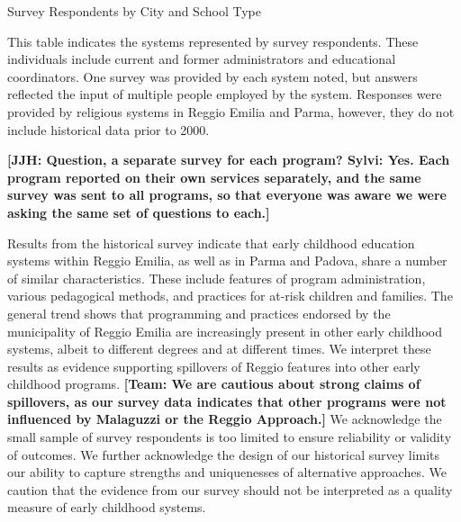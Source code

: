 \begin{table}[H]
\centering
\caption{Survey Respondents by City and School Type}\label{tab:respondents}
\begin{threeparttable}
	
\begin{tablenotes}
This table indicates the systems represented by survey respondents. These individuals include current and former administrators and educational coordinators. One survey was provided by each system noted, but answers reflected the input of multiple people employed by the system. Responses were provided by religious systems in Reggio Emilia and Parma, however, they do not include historical data prior to 2000.
\end{tablenotes}
\end{threeparttable}
\end{table}

\textbf{[JJH: Question, a separate survey for each program? Sylvi: Yes. Each program reported on their own services separately, and the same survey was sent to all programs, so that everyone was aware we were asking the same set of questions to each.]}

Results from the historical survey indicate that early childhood education systems within Reggio Emilia, as well as in Parma and Padova, share a number of similar characteristics. These include features of program administration, various pedagogical methods, and practices for at-risk children and families. The general trend shows that programming and practices endorsed by the municipality of Reggio Emilia are increasingly present in other early childhood systems, albeit to different degrees and at different times. We interpret these results as evidence supporting spillovers of Reggio features into other early childhood programs. \textbf{[Team: We are cautious about strong claims of spillovers, as our survey data indicates that other programs were not influenced by Malaguzzi or the Reggio Approach.]} We acknowledge the small sample of survey respondents is too limited to ensure reliability or validity of outcomes. We further acknowledge the design of our historical survey limits our ability to capture strengths and uniquenesses of alternative approaches. We caution that the evidence from our survey should not be interpreted as a quality measure of early childhood systems.

